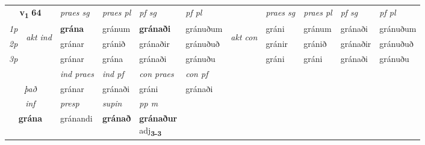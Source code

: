 \noindent
\begin{tabular}{lllllllllll} \toprule
\multicolumn{2}{c}{\textbf{v{\textsubscript{1}}} \Large{\textbf{64}}}  &  \textit{praes sg}  & \textit{praes pl}  &\textit{ pf sg} & \textit{pf pl} &  &  \textit{praes sg}  & \textit{praes pl}  & \textit{pf sg} & \textit{pf pl } \\*
	\cmidrule{3-6} \cmidrule{8-11}
 {\textit{1p}} & \multirow{3}{*}{\begin{turn}{90}\textit{akt ind}\end{turn}} & \textbf{grána} & gránum & \textbf{gránaði} & gránuðum & \multirow{3}{*}{\begin{turn}{90}\textit{akt con}\end{turn}} &gráni & gránum & gránaði & gránuðum\\*
 {\textit{2p}} &  &  gránar  & gránið & gránaðir & gránuðuð & & gránir & gránið & gránaðir & gránuðuð \\*
{\textit{3p}} &  & gránar & grána & gránaði & gránuðu & & gráni & gráni& gránaði & gránuðu \\*
\cmidrule{3-6} \cmidrule{8-11}

   & &  \textit{ind praes} & \textit{ind pf} & \textit{con praes} & \textit{con pf} \\*
\multicolumn{2}{c}{ \textit{það} } & gránar & gránaði & gráni & gránaði \\*

\cmidrule{3-5}
   \multicolumn{2}{c}{\textit{inf}}     & \textit{presp} & \textit{supin}  & \textit{pp m} \\*
  \multicolumn{2}{c}{\textbf{grána}}      & gránandi &  \textbf{gránað}  & \specialcell{\textbf{gránaður} \\ adj\textbf{\textsubscript{3-3}}} \\*
\end{tabular}

